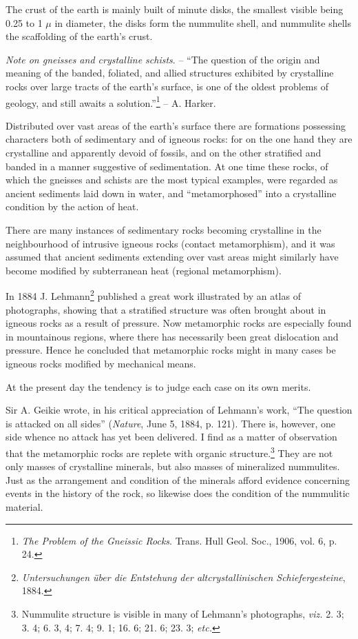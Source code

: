 \documentclass[a4paper, 12pt, oneside]{article}
\begin{document}
The crust of the earth is mainly built of minute disks, the smallest visible being 0.25 to 1 $\mu$ in diameter, the disks form the nummulite shell, and nummulite shells the scaffolding of the earth's crust.

\emph{Note on gneisses and crystalline schists}. -- ``The question of the origin and meaning of the banded, foliated, and allied structures exhibited by crystalline rocks over large tracts of the earth's surface, is one of the oldest problems of geology, and still awaits a solution.''\footnote{\emph{The Problem of the Gneissic Rocks}. Trans. Hull Geol. Soc., 1906, vol. 6, p. 24.} -- A. Harker.

Distributed over vast areas of the earth's surface there are formations possessing characters both of sedimentary and of igneous rocks: for on the one hand they are crystalline and apparently devoid of fossils, and on the other stratified and banded in a manner suggestive of sedimentation. At one time these rocks, of which the gneisses and schists are the most typical examples, were regarded as ancient sediments laid down in water, and ``metamorphosed'' into a crystalline condition by the action of heat.

There are many instances of sedimentary rocks becoming crystalline in the neighbourhood of intrusive igneous rocks (contact metamorphism), and it was assumed that ancient sediments extending over vast areas might similarly have become modified by subterranean heat (regional metamorphism).

In 1884 J. Lehmann\footnote{\emph{Untersuchungen über die Entstehung der altcrystallinischen Schiefergesteine}, 1884.} published a great work illustrated by an atlas of photographs, showing that a stratified structure was often brought about in igneous rocks as a result of pressure. Now metamorphic rocks are especially found in mountainous regions, where there has necessarily been great dislocation and pressure. Hence he concluded that metamorphic rocks might in many cases be igneous rocks modified by mechanical means.

At the present day the tendency is to judge each case on its own merits.

Sir A. Geikie wrote, in his critical appreciation of Lehmann's work, ``The question is attacked on all sides'' (\emph{Nature}, June 5, 1884, p. 121). There is, however, one side whence no attack has yet been delivered. I find as a matter of observation that the metamorphic rocks are replete with organic structure.\footnote{Nummulite structure is visible in many of Lehmann's photographs, \emph{viz.} 2. 3; 3. 4; 6. 3, 4; 7. 4; 9. 1; 16. 6; 21. 6; 23. 3; \emph{etc.}} They are not only masses of crystalline minerals, but also masses of mineralized nummulites. Just as the arrangement and condition of the minerals afford evidence concerning events in the history of the rock, so likewise does the condition of the nummulitic material.
\end{document}
